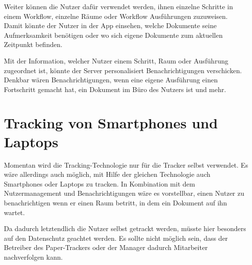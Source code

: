 Weiter können die Nutzer dafür verwendet werden, ihnen einzelne Schritte in einem Workflow, einzelne Räume
oder Workflow Ausführungen zuzuweisen.
Damit könnte der Nutzer in der App einsehen, welche Dokumente seine Aufmerksamkeit benötigen oder wo sich eigene Dokumente
zum aktuellen Zeitpunkt befinden.

Mit der Information, welcher Nutzer einem Schritt, Raum oder Ausführung zugeordnet ist, könnte der Server personalisiert
Benachrichtigungen verschicken.
Denkbar wären Benachrichtigungen, wenn eine eigene Ausführung einen Fortschritt gemacht hat, ein Dokument im Büro
des Nutzers ist und mehr.

\section{Tracking von Smartphones und Laptops}

Momentan wird die Tracking-Technologie nur für die Tracker selbst verwendet.
Es wäre allerdings auch möglich, mit Hilfe der gleichen Technologie auch Smartphones oder Laptops zu tracken.
In Kombination mit dem Nutzermanagement und Benachrichtigungen wäre es vorstellbar, einen Nutzer zu benachrichtigen
wenn er einen Raum betritt, in dem ein Dokument auf ihn wartet.

Da dadurch letztendlich die Nutzer selbst getrackt werden, müsste hier besonders auf den Datenschutz geachtet werden.
Es sollte nicht möglich sein, dass der Betreiber des Paper-Trackers oder der Manager dadurch Mitarbeiter nachverfolgen kann.
